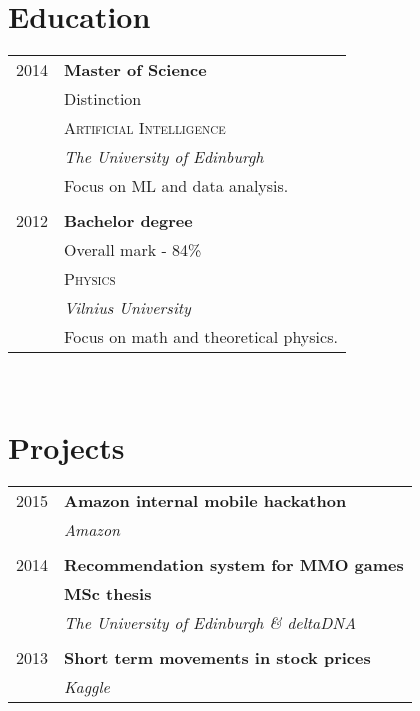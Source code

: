 \documentclass[10pt]{article} %
\begin{document}
{\begin{minipage}[t]{0.36\textwidth}

\section{Education}

\begin{tabular}{rl} %

2014 & \textbf{Master of Science} \\
& \small Distinction\\
& \textsc{Artificial Intelligence} \\
& \textit{The University of Edinburgh} \\
& \small Focus on ML and data analysis. \\
&\\

2012 & \textbf{Bachelor degree}\\
& \small Overall mark - 84\% \\
& \textsc{Physics} \\
& \textit{Vilnius University} \\
& \small Focus on math and theoretical physics. \\


\end{tabular}\\[10pt]


\section{Projects}

\begin{tabular}{rl}

2015     & \textbf{Amazon internal mobile hackathon}\\
& \textit{Amazon}\\
&\\
2014     & \textbf{Recommendation system for MMO games}\\
         & \textbf{MSc thesis}\\
& \textit{The University of Edinburgh \& deltaDNA}\\
&\\
2013	 & \textbf{Short term movements in stock prices}\\
& \textit{Kaggle}


\end{tabular}
\end{minipage}}
\end{document}
